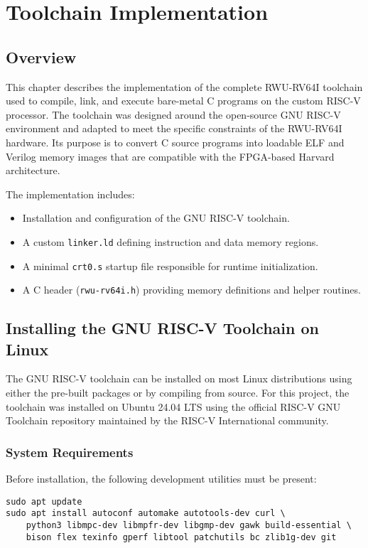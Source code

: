 \chapter{Toolchain Implementation}
\label{ch:toolchain}

\section{Overview}
This chapter describes the implementation of the complete RWU-RV64I toolchain used to compile, link, and execute bare-metal C programs on the custom RISC-V processor.  
The toolchain was designed around the open-source GNU RISC-V environment and adapted to meet the specific constraints of the RWU-RV64I hardware.  
Its purpose is to convert C source programs into loadable ELF and Verilog memory images that are compatible with the FPGA-based Harvard architecture.  

The implementation includes:
\begin{itemize}
    \item Installation and configuration of the GNU RISC-V toolchain.
    \item A custom \texttt{linker.ld} defining instruction and data memory regions.
    \item A minimal \texttt{crt0.s} startup file responsible for runtime initialization.
    \item A C header (\texttt{rwu-rv64i.h}) providing memory definitions and helper routines.
\end{itemize}

\section{Installing the GNU RISC-V Toolchain on Linux}
The GNU RISC-V toolchain can be installed on most Linux distributions using either the pre-built packages or by compiling from source.  
For this project, the toolchain was installed on Ubuntu 24.04 LTS using the official RISC-V GNU Toolchain repository maintained by the RISC-V International community.

\subsection{System Requirements}
Before installation, the following development utilities must be present:
\begin{verbatim}
sudo apt update
sudo apt install autoconf automake autotools-dev curl \
    python3 libmpc-dev libmpfr-dev libgmp-dev gawk build-essential \
    bison flex texinfo gperf libtool patchutils bc zlib1g-dev git
\end{verbatim}

